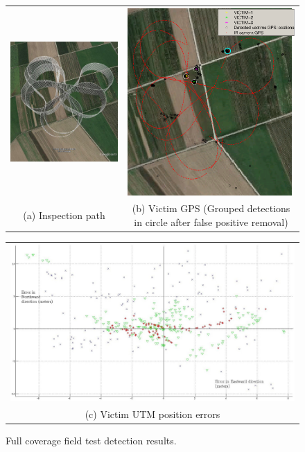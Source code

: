 \documentclass[runningheads]{llncs}
\begin{document}
\begin{figure}
  \centering
  \begin{tabular}{cc}
    \hspace{-1cm}
    \includegraphics[width=7cm]{img/victim_gps/SIP.png} &
    \includegraphics[width=7cm]{img/victim_gps/SIP_detections_map.eps} \\
    \small (a) Inspection path & 
    \small (b) Victim GPS \tiny (Grouped detections in circle after false positive removal)
  \end{tabular}

  \vspace{\floatsep}
  
  \begin{tabular}{c}
    \includegraphics[width=11cm]{img/victim_gps/victim_utm_errors.jpg} \\
    \small (c) Victim UTM position errors
  \end{tabular}

  \caption{Full coverage field test detection results.}\label{fig:victim_gps}
\end{figure}
\end{document}
